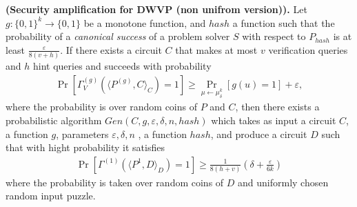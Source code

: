 \documentclass[11pt,a4paper,article,oneside]{memoir}
\begin{document}
\begin{theorem} {\textbf{(Security amplification for DWVP (non unifrom version)).}}
  Let $g: \{0,1\}^k \rightarrow \{0,1\}$ be a monotone function, and $hash$ a function such that
  the probability of a \textit{canonical success} of a problem solver $S$ with respect to $P_{hash}$ is at least $\frac{\varepsilon}{8\left(v + h\right)}$.
  If there exists a circuit $C$ that makes at most $v$ verification queries and $h$ hint queries
  and succeeds with probability
  \begin{align}
    \Pr_{}[\Gamma_{V}^{(g)}( \langle P^{(g)},C \rangle_C ) = 1] \geq \Pr_{\mu \leftarrow \mu_{\delta}^{k}}[g(u) = 1] + \varepsilon ,
  \end{align}
  where the probability is over random coins of $P$ and $C$,
  then there exists a probabilistic algorithm $Gen(C, g, \varepsilon, \delta, n, hash)$ which takes as input a circuit $C$, a function $g$,
  parameters $\varepsilon, \delta, n$ , a function $hash$, and
  produce a circuit $D$ such that with hight probability
  it satisfies
  \begin{align}
    \Pr_{}[\Gamma^{(1)} \left( \langle P^{1} ,D \rangle_D \right) = 1] \geq \frac{1}{8(h+v)} \left( \delta + \frac{\varepsilon}{6k} \right)
  \end{align}
  where the probability is taken over random coins of $D$ and uniformly chosen random input puzzle.
\end{theorem}




\end{document}
